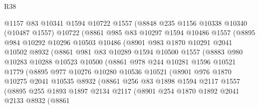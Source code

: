\begin{lexlean}{R38}
\begin{coremodule}
            @1157
            @83
            @10341
            @1594
            @10722
            @1557
            (@8848
              @235
              @1156
              @10338
              @10340
              (@10487 @1557)
              @10722
              (@8861
                @985
                @83
                @10297
                @1594
                @10486
                @1557
                (@8895
                  @984
                  @10292
                  @10296
                  @10503
                  @10486
                  (@8901
                    @983
                    @1870
                    @10291
                    @2041
                    @10502
                    @8932
                    (@8861
                      @981
                      @83
                      @10289
                      @1594
                      @10500
                      @1557
                      (@8883
                        @980
                        @10283
                        @10288
                        @10523
                        @10500
                        (@8861
                          @978
                          @244
                          @10281
                          @1596
                          @10521
                          @1779
                          (@8895
                            @977
                            @10276
                            @10280
                            @10536
                            @10521
                            (@8901
                              @976
                              @1870
                              @10275
                              @2041
                              @10535
                              @8932
                              (@8861
                                @256
                                @83
                                @1898
                                @1594
                                @2117
                                @1557
                                (@8895
                                  @255
                                  @1893
                                  @1897
                                  @2134
                                  @2117
                                  (@8901
                                    @254
                                    @1870
                                    @1892
                                    @2041
                                    @2133
                                    @8932
                                    (@8861

\end{coremodule}
\end{lexlean}
